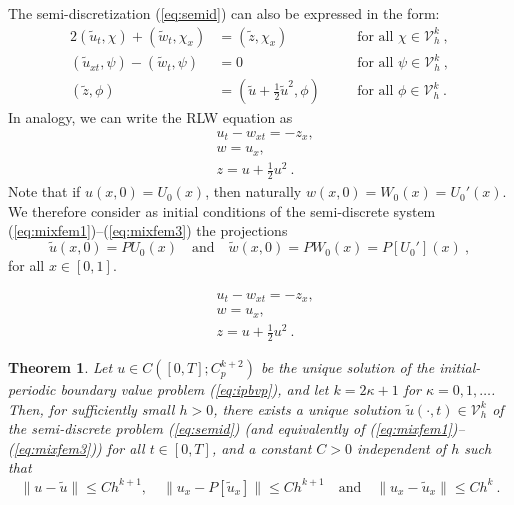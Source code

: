 \documentclass[10pt,a4paper]{amsart}
\newtheorem{theorem}{Theorem}
\newcommand{\tu}{\tilde{u}}
\newcommand{\tw}{\tilde{w}}
\newcommand{\tz}{\tilde{z}}
\begin{document}
The semi-discretization (\ref{eq:semid}) can also be expressed in the form:
\begin{alignat}{2}
(\tu_t,\chi)+(\tw_t,\chi_x)&=(\tz,\chi_x) & & \quad \text{for all $\chi\in \mathcal{V}_h^k$}\ ,\label{eq:mixfem1}\\
(\tu_{xt},\psi)-(\tw_t,\psi) &= 0 & & \quad \text{for all $\psi\in \mathcal{V}_h^k$}\ ,\label{eq:mixfem2}\\
(\tz,\phi)&=(\tu+\tfrac{1}{2}\tu^2,\phi)& & \quad \text{for all $\phi\in \mathcal{V}_h^k$}\ .\label{eq:mixfem3}
\end{alignat}
%
In analogy, we can write the RLW equation as
%
\begin{align}
& u_t-w_{xt}=-z_x,\label{eq:bbmn1}\\
& w = u_x, \label{eq:bbmn2}\\
& z = u+\tfrac{1}{2}u^2\ . \label{eq:bbmn3}
\end{align}
%
Note that if $u(x,0)=U_0(x)$, then naturally $w(x,0)=W_0(x)=U_0'(x)$. 
%
We therefore consider as initial conditions of the semi-discrete system (\ref{eq:mixfem1})--(\ref{eq:mixfem3}) the projections
\begin{equation}\label{eq:ics}
\tilde{u}(x,0)=PU_0(x)\quad \text{and}\quad  \tilde{w}(x,0)=PW_0(x)=P[U_0'](x)\ ,
\end{equation}
for all $x\in[0,1]$.

\begin{align}
& u_t-w_{xt}=-z_x,\\
& w = u_x, \\
& z = u+\tfrac{1}{2}u^2\ . 
\end{align}

\begin{theorem}\label{thrm:Theorem1}
Let $u\in C([0,T];C^{k+2}_p)$ be the unique solution of the initial-periodic boundary value problem (\ref{eq:ipbvp}), and let $k=2\kappa+1$ for $\kappa=0,1,\dots$. Then, for sufficiently small $h>0$, there exists a unique solution $\tilde{u}(\cdot,t)\in \mathcal{V}_h^k$ of the semi-discrete problem (\ref{eq:semid}) (and equivalently of (\ref{eq:mixfem1})--(\ref{eq:mixfem3}))  for all $t\in[0,T]$, and a constant $C>0$ independent of $h$ such that
$$\|u-\tilde{u}\|\leq C h^{k+1}, \quad \|u_x-P[\tilde{u}_x]\|\leq C h^{k+1}\quad \text{and}\quad \|u_x-\tilde{u}_x\|\leq C h^k \ .$$
\end{theorem}
\end{document}

